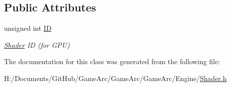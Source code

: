 \subsection*{Public Attributes}
\begin{DoxyCompactItemize}
\item 
\hypertarget{class_shader_a142a08b6fbdfc982d82ca10ee0b0f38d}{unsigned int \hyperlink{class_shader_a142a08b6fbdfc982d82ca10ee0b0f38d}{I\+D}}\label{class_shader_a142a08b6fbdfc982d82ca10ee0b0f38d}

\begin{DoxyCompactList}\small\item\em \hyperlink{class_shader}{Shader} I\+D (for G\+P\+U) \end{DoxyCompactList}\end{DoxyCompactItemize}


The documentation for this class was generated from the following file\+:\begin{DoxyCompactItemize}
\item 
H\+:/\+Documents/\+Git\+Hub/\+Game\+Arc/\+Game\+Arc/\+Game\+Arc/\+Engine/\hyperlink{_shader_8h}{Shader.\+h}\end{DoxyCompactItemize}
